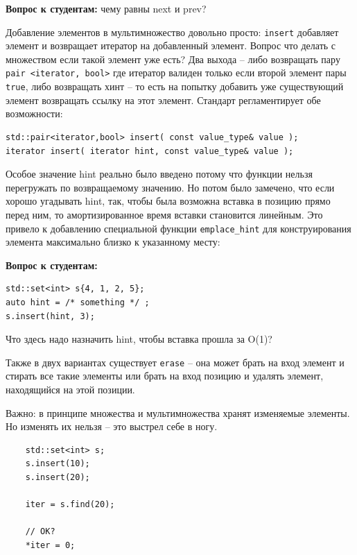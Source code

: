 \documentclass[a4paper,12pt,oneside]{article}
\newif\ifanswers
\begin{document}
\textbf{Вопрос к студентам:} чему равны next и prev?

\ifanswers
Верный ответ: конечно же 2 и 5 соответственно (2 потому что lower bound указывает на элемент 3, а 5 потому что upper bound указывает на 4).
\fi

Добавление элементов в мультимножество довольно просто: \lstinline!insert! добавляет элемент и возвращает итератор на добавленный элемент. Вопрос что делать с множеством если такой элемент уже есть? Два выхода -- либо возвращать пару \lstinline!pair <iterator, bool>! где итератор валиден только если второй элемент пары \lstinline!true!, либо возвращать хинт -- то есть на попытку добавить уже существующий элемент возвращать ссылку на этот элемент. Стандарт регламентирует обе возможности:

\begin{lstlisting}
std::pair<iterator,bool> insert( const value_type& value );
iterator insert( iterator hint, const value_type& value );
\end{lstlisting}

Особое значение hint реально было введено потому что функции нельзя перегружать по возвращаемому значению. Но потом было замечено, что если хорошо угадывать hint, так, чтобы была возможна вставка в позицию прямо перед ним, то амортизированное время вставки становится линейным. Это привело к добавлению специальной функции \lstinline!emplace_hint! для конструирования элемента максимально близко к указанному месту:

\textbf{Вопрос к студентам:}

\begin{lstlisting}
std::set<int> s{4, 1, 2, 5};
auto hint = /* something */ ;
s.insert(hint, 3);
\end{lstlisting}

Что здесь надо назначить hint, чтобы вставка прошла за O(1)?

\ifanswers
Верный ответ: \lstinline!s.upper_bound(3)!
\fi

Также в двух вариантах существует \lstinline!erase! -- она может брать на вход элемент и стирать все такие элементы или брать на вход позицию и удалять элемент, находящийся на этой позиции.

Важно: в принципе множества и мультимножества хранят изменяемые элементы. Но изменять их нельзя -- это выстрел себе в ногу.

\begin{lstlisting}
    std::set<int> s;
    s.insert(10);
    s.insert(20);

    iter = s.find(20);

    // OK?
    *iter = 0;
\end{lstlisting}
\end{document}
